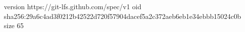 version https://git-lfs.github.com/spec/v1
oid sha256:29a6c4ad3f0212b42522d720f57904dacef5a2c372aeb6eb1e34ebbb15024c0b
size 65
